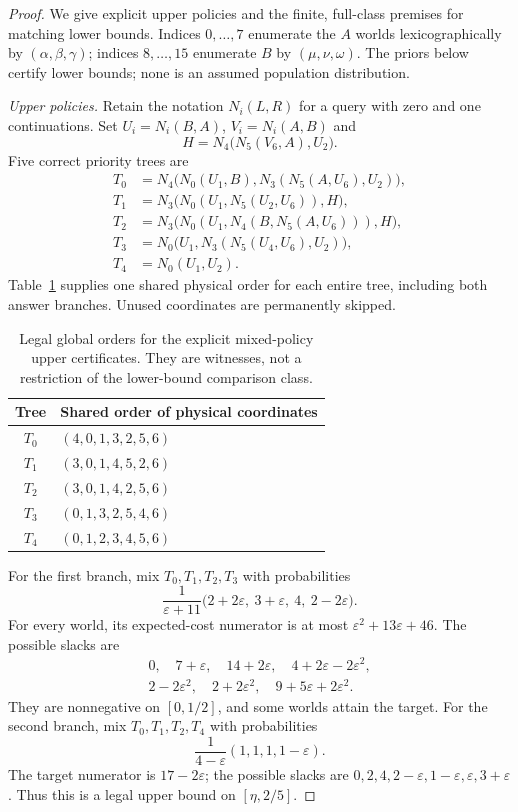 \begin{proof}
We give explicit upper policies and the finite, full-class premises for matching lower bounds. Indices $0,\ldots,7$ enumerate the $A$ worlds lexicographically by $(\alpha,\beta,\gamma)$; indices $8,\ldots,15$ enumerate $B$ by $(\mu,\nu,\omega)$. The priors below certify lower bounds; none is an assumed population distribution.

\emph{Upper policies.} Retain the notation $N_i(L,R)$ for a query with zero and one continuations. Set $U_i=N_i(B,A)$, $V_i=N_i(A,B)$ and
\[
 H=N_4\bigl(N_5(V_6,A),U_2\bigr).
\]
Five correct priority trees are
\begin{align*}
 T_0&=N_4\bigl(N_0(U_1,B),N_3(N_5(A,U_6),U_2)\bigr),\\
 T_1&=N_3\bigl(N_0(U_1,N_5(U_2,U_6)),H\bigr),\\
 T_2&=N_3\bigl(N_0(U_1,N_4(B,N_5(A,U_6))),H\bigr),\\
 T_3&=N_0\bigl(U_1,N_3(N_5(U_4,U_6),U_2)\bigr),\\
 T_4&=N_0(U_1,U_2).
\end{align*}
Table~\ref{tab:seven-private-orders} supplies one shared physical order for each entire tree, including both answer branches. Unused coordinates are permanently skipped.
\begin{table}[ht]
\centering\small
\begin{tabular}{@{}cl@{}}\toprule
Tree & Shared order of physical coordinates\\\midrule
$T_0$ & $(4,0,1,3,2,5,6)$\\
$T_1$ & $(3,0,1,4,5,2,6)$\\
$T_2$ & $(3,0,1,4,2,5,6)$\\
$T_3$ & $(0,1,3,2,5,4,6)$\\
$T_4$ & $(0,1,2,3,4,5,6)$\\\bottomrule
\end{tabular}
\caption{Legal global orders for the explicit mixed-policy upper certificates. They are witnesses, not a restriction of the lower-bound comparison class.}
\label{tab:seven-private-orders}
\end{table}

For the first branch, mix $T_0,T_1,T_2,T_3$ with probabilities
\[
 \frac{1}{\varepsilon+11}
 \bigl(2+2\varepsilon,\ 3+\varepsilon,\ 4,\ 2-2\varepsilon\bigr).
\]
For every world, its expected-cost numerator is at most $\varepsilon^2+13\varepsilon+46$. The possible slacks are
\[
 \begin{gathered}
 0,\quad 7+\varepsilon,\quad14+2\varepsilon,\quad4+2\varepsilon-2\varepsilon^2,\\
 2-2\varepsilon^2,\quad2+2\varepsilon^2,\quad9+5\varepsilon+2\varepsilon^2.
 \end{gathered}
\]
They are nonnegative on $[0,1/2]$, and some worlds attain the target. For the second branch, mix $T_0,T_1,T_2,T_4$ with probabilities
\[
 \frac{1}{4-\varepsilon}(1,1,1,1-\varepsilon).
\]
The target numerator is $17-2\varepsilon$; the possible slacks are $0,2,4,2-\varepsilon,1-\varepsilon,\varepsilon,3+\varepsilon$. Thus this is a legal upper bound on $[\eta,2/5]$.


\end{proof}

